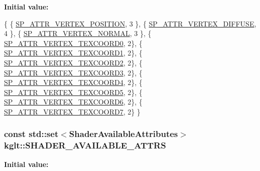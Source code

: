 {\bfseries Initial value\-:}
\begin{DoxyCode}
 \{
    \{ \hyperlink{namespacekglt_a402d09e4a0c30dbb100d563c0a3d945aaa2ca1b2275ef87e9256be7dbfadeb5c4}{SP\_ATTR\_VERTEX\_POSITION}, 3 \},
    \{ \hyperlink{namespacekglt_a402d09e4a0c30dbb100d563c0a3d945aa0c75095f640f0f6cc05b3f321647c795}{SP\_ATTR\_VERTEX\_DIFFUSE}, 4 \},
    \{ \hyperlink{namespacekglt_a402d09e4a0c30dbb100d563c0a3d945aa0d3570874a02b8b9dea67e61ce9e30ca}{SP\_ATTR\_VERTEX\_NORMAL}, 3 \},
    \{ \hyperlink{namespacekglt_a402d09e4a0c30dbb100d563c0a3d945aa81e8ec5615467df7c39b60aa82f8592c}{SP\_ATTR\_VERTEX\_TEXCOORD0}, 2\},
    \{ \hyperlink{namespacekglt_a402d09e4a0c30dbb100d563c0a3d945aa71652702bf9363bcdd5f91672c5816b7}{SP\_ATTR\_VERTEX\_TEXCOORD1}, 2\},
    \{ \hyperlink{namespacekglt_a402d09e4a0c30dbb100d563c0a3d945aae697dcc8b45dea2a9fe4c744948e87cf}{SP\_ATTR\_VERTEX\_TEXCOORD2}, 2\},
    \{ \hyperlink{namespacekglt_a402d09e4a0c30dbb100d563c0a3d945aa11e72154c74c3c7d7db5c1131be62dcf}{SP\_ATTR\_VERTEX\_TEXCOORD3}, 2\},
    \{ \hyperlink{namespacekglt_a402d09e4a0c30dbb100d563c0a3d945aa0b935f20e1a6585368dc6b106eb9bf30}{SP\_ATTR\_VERTEX\_TEXCOORD4}, 2\},
    \{ \hyperlink{namespacekglt_a402d09e4a0c30dbb100d563c0a3d945aaf8ce012293ef38dc8be6fee43014c86e}{SP\_ATTR\_VERTEX\_TEXCOORD5}, 2\},
    \{ \hyperlink{namespacekglt_a402d09e4a0c30dbb100d563c0a3d945aa88b139edb62066d196cb198e121de857}{SP\_ATTR\_VERTEX\_TEXCOORD6}, 2\},
    \{ \hyperlink{namespacekglt_a402d09e4a0c30dbb100d563c0a3d945aa1305f2421d23f4121e11eed0afe12c85}{SP\_ATTR\_VERTEX\_TEXCOORD7}, 2\}
\}
\end{DoxyCode}
\hypertarget{namespacekglt_a3de57ba7765380c9a02def24525203db}{
\subsubsection[{S\-H\-A\-D\-E\-R\-\_\-\-A\-V\-A\-I\-L\-A\-B\-L\-E\-\_\-\-A\-T\-T\-R\-S}]{\setlength{\rightskip}{0pt plus 5cm}const std\-::set$<${\bf Shader\-Available\-Attributes}$>$ kglt\-::\-S\-H\-A\-D\-E\-R\-\_\-\-A\-V\-A\-I\-L\-A\-B\-L\-E\-\_\-\-A\-T\-T\-R\-S}}\label{namespacekglt_a3de57ba7765380c9a02def24525203db}
{\bfseries Initial value\-:}
